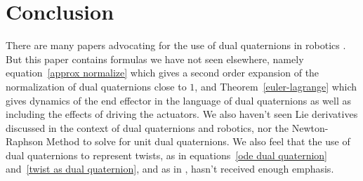 \documentclass[reqno,12pt]{amsart}
\begin{document}
\section{Conclusion}

There are many papers advocating for the use of dual quaternions in robotics \cite{adorno,han-et-al,wang-et-al}.  But this paper contains formulas we have not seen elsewhere, namely equation~\eqref{approx normalize} which gives a second order expansion of the normalization of dual quaternions close to $1$, and Theorem~\ref{euler-lagrange} which gives dynamics of the end effector in the language of dual quaternions as well as including the effects of driving the actuators.  We also haven't seen Lie derivatives discussed in the context of dual quaternions and robotics, nor the Newton-Raphson Method to solve for unit dual quaternions.  We also feel that the use of dual quaternions to represent twists, as in equations~\eqref{ode dual quaternion} and~\eqref{twist as dual quaternion}, and as in \cite{han-et-al,wang-et-al}, hasn't received enough emphasis.
\end{document}
